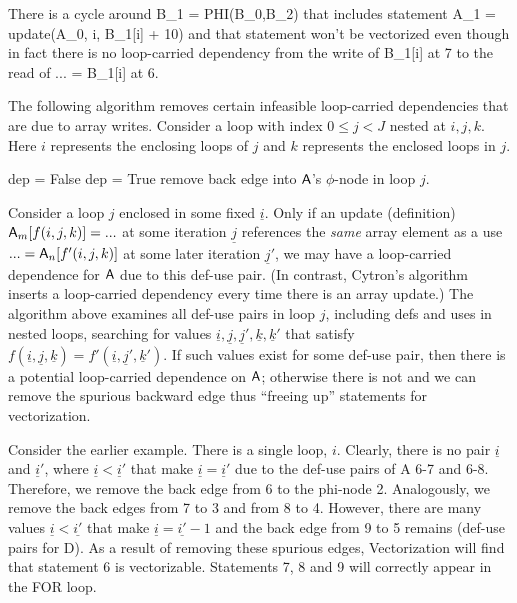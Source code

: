 There is a cycle around {\sf B\_1 = PHI(B\_0,B\_2)} that includes statement
{\sf A\_1 = update(A\_0, i, B\_1[i] + 10)} and that statement won't be vectorized even
though in fact there is no loop-carried dependency from the write of {\sf B\_1[i]} at 7 to the
read of {\sf ... = B\_1[i]} at 6.

The following algorithm removes certain infeasible loop-carried dependencies that are due to array writes. Consider a loop with index $0 \le j < J$
nested at $i,j,k$. Here $i$ represents the enclosing loops of $j$ and $k$ represents the enclosed loops in $j$.

\begin{algorithmic}
\STATE {}
\STATE dep = False
\STATE dep = True
\ENDIF
\ENDFOR
{}
\STATE remove back edge into ${\sf A}$'s $\phi$-node in loop $j$.
\ENDIF
\ENDFOR
\end{algorithmic}

Consider a loop $j$ enclosed in some fixed $\underline{i}$. Only if an update (definition) ${\sf A}_m[f(i,j,k)] = ... $ at some iteration $\underline{j}$
references the \emph{same} array element as a use $ ... = {\sf A}_n[f'(i,j,k)]$ at some later iteration $\underline{j}'$,
we may have a loop-carried dependence for ${\sf A}$ due to this def-use pair. (In contrast, Cytron's algorithm inserts a loop-carried dependency every time there is an array update.)
The algorithm above examines all def-use pairs in loop $j$, including defs and uses in nested loops, searching for values $\underline{i}, \underline{j}, \underline{j}', \underline{k}, \underline{k}'$ that satisfy
$f(\underline{i},\underline{j},\underline{k}) = f'(\underline{i},\underline{j}',\underline{k}')$. If such values exist for some def-use pair, then there is a potential
loop-carried dependence on ${\sf A}$; otherwise there is not and we can remove the spurious backward edge thus ``freeing up'' statements for vectorization. %

Consider the earlier example. There is a single loop, $i$. Clearly, there is no pair $\underline{i}$ and $\underline{i}'$, where $\underline{i} < \underline{i}'$ that make $\underline{i} = \underline{i}'$
due to the def-use pairs of {\sf A} 6-7 and 6-8.
Therefore, we remove the back edge from 6 to the phi-node 2. Analogously, we remove the back edges from 7 to 3 and from 8 to 4. However, there are many values $\underline{i} < \underline{i'}$ that make $\underline{i} = \underline{i'}-1$ and the back edge from 9 to 5 remains (def-use pairs for {\sf D}). As a result of removing these spurious edges, Vectorization will find that statement 6 is vectorizable. Statements 7, 8 and 9 will correctly appear in the FOR loop.

